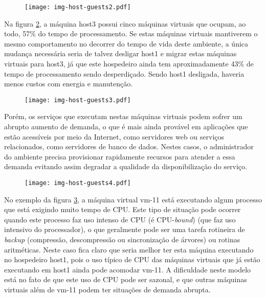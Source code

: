 \begin{figure}[htp]
\centering
\texttt{[image: img-host-guests2.pdf]}
\label{fig:hostguests2}
\end{figure}

Na figura \ref{fig:hostguests3}, a máquina host3 possui cinco máquinas
virtuais que ocupam, ao todo, 57\% do tempo de processamento. Se estas
máquinas virtuais mantiverem o mesmo comportamento no decorrer do tempo de
vida deste ambiente, a única mudança necessária seria de talvez desligar
host1 e migrar estas máquinas virtuais para host3, já que
este hospedeiro ainda tem aproximadamente 43\% de tempo de processamento
sendo desperdiçado. Sendo host1 desligada, haveria menos custos
com energia e manutenção.

\begin{figure}[htp]
\centering
\texttt{[image: img-host-guests3.pdf]}
\label{fig:hostguests3}
\end{figure}

Porém, os serviços que executam nestas máquinas virtuais podem sofrer um
abrupto aumento de demanda, o que é mais ainda provável em aplicações que
estão acessíveis por meio da Internet, como servidores web ou serviços
relacionados, como servidores de banco de dados. Nestes casos, o
administrador do ambiente precisa provisionar rapidamente recursos para
atender a essa demanda evitando assim degradar a qualidade da
disponibilização do serviço.

\begin{figure}[htp]
\centering
\texttt{[image: img-host-guests4.pdf]}
\label{fig:hostguests4}
\end{figure}

No exemplo da figura \ref{fig:hostguests4}, a máquina virtual
vm-11 está executando algum processo que está exigindo muito tempo
de CPU. Este tipo de situação pode ocorrer quando este processo faz uso intenso
de CPU (é CPU-\emph{bound}) (que faz uso intensivo do processador), o que
geralmente
pode ser uma tarefa rotineira de \emph{backup} (compressão, descompressão ou
sincronização de árvores) ou rotinas aritméticas. Neste caso fica claro que
seria melhor ter esta máquina executando no hospedeiro host1, pois o
uso típico de CPU das máquinas virtuais que já estão executando em host1 ainda
pode acomodar vm-11. A dificuldade neste modelo está no fato de que este uso de
CPU pode ser sazonal, e que outras máquinas virtuais além de vm-11 podem ter
situações de demanda abrupta.

